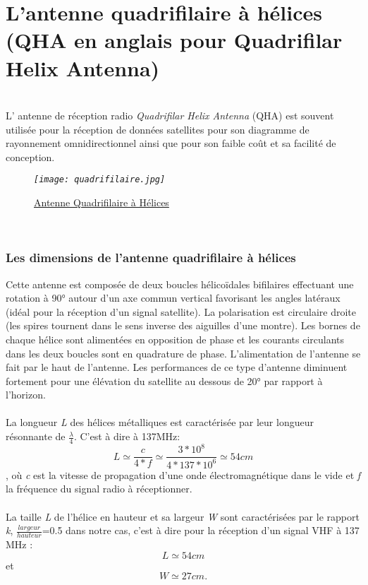 \documentclass[12pt,fleqn]{book} %
\begin{document}
\section{L'antenne quadrifilaire à hélices (QHA en anglais pour Quadrifilar Helix Antenna)}
~\\\indent L' antenne de réception radio \emph{Quadrifilar Helix Antenna} (QHA) est souvent utilisée pour la réception de données satellites pour son diagramme de rayonnement omnidirectionnel ainsi que pour son faible coût et sa facilité de conception.
\begin{figure}[H]
	\centering
	\itshape
	\texttt{[image: quadrifilaire.jpg]}
	\caption{\label{QHA} \underline{Antenne Quadrifilaire à Hélices}}
\end{figure}
~\\
\subsubsection{Les dimensions de l'antenne quadrifilaire à hélices}
\noindent Cette antenne est composée de deux boucles hélicoïdales bifilaires effectuant une rotation à 90° autour d'un axe commun vertical favorisant les angles latéraux (idéal pour la réception d'un signal satellite). La polarisation est circulaire droite (les spires tournent dans le sens inverse des aiguilles d'une montre). Les bornes de chaque hélice sont alimentées en opposition de phase et les courants circulants dans les deux boucles sont en quadrature de phase. L'alimentation de l'antenne se fait par le haut de l'antenne. Les performances de ce type d'antenne diminuent fortement pour une élévation du satellite au dessous de 20° par rapport à l'horizon.
~\\\\La longueur \emph{L} des hélices métalliques est caractérisée par leur longueur résonnante de \(\frac{\lambda}{4}\). C'est à dire à 137MHz:
$$ L\simeq\frac{c}{4*f}\simeq\frac{3*10^8}{4*137*10^6}\simeq54 cm $$, où \emph{c} est la vitesse de propagation d'une onde électromagnétique dans le vide et \emph{f} la fréquence du signal radio à réceptionner.
~\\\\La taille \emph{L} de l'hélice en hauteur et sa largeur \emph{W} sont caractérisées par le rapport \emph{k}, \(\frac{largeur}{hauteur}\)=0.5 dans notre cas, c'est à dire pour la réception d'un signal VHF à 137 MHz : 
$$ L\simeq54 cm $$
et 
$$ W\simeq27 cm. $$
\end{document}

